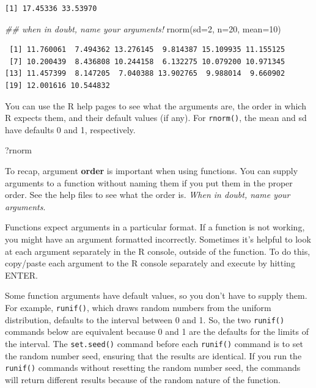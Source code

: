 \documentclass[
  13,
  letterpaper,
]{report}
\newenvironment{Shaded}{\begin{snugshade}}{\end{snugshade}}
\newcommand{\AttributeTok}[1]{\textcolor[rgb]{0.40,0.45,0.13}{#1}}
\newcommand{\DecValTok}[1]{\textcolor[rgb]{0.68,0.00,0.00}{#1}}
\newcommand{\DocumentationTok}[1]{\textcolor[rgb]{0.37,0.37,0.37}{\textit{#1}}}
\newcommand{\FunctionTok}[1]{\textcolor[rgb]{0.28,0.35,0.67}{#1}}
\newcommand{\NormalTok}[1]{\textcolor[rgb]{0.00,0.23,0.31}{#1}}
\begin{document}
\begin{verbatim}
[1] 17.45336 33.53970
\end{verbatim}

\begin{Shaded}
\begin{Highlighting}[]
\DocumentationTok{\#\# when in doubt, name your arguments!}
\FunctionTok{rnorm}\NormalTok{(}\AttributeTok{sd=}\DecValTok{2}\NormalTok{, }\AttributeTok{n=}\DecValTok{20}\NormalTok{, }\AttributeTok{mean=}\DecValTok{10}\NormalTok{)}
\end{Highlighting}
\end{Shaded}

\begin{verbatim}
 [1] 11.760061  7.494362 13.276145  9.814387 15.109935 11.155125
 [7] 10.200439  8.436808 10.244158  6.132275 10.079200 10.971345
[13] 11.457399  8.147205  7.040388 13.902765  9.988014  9.660902
[19] 12.001616 10.544832
\end{verbatim}

You can use the R help pages to see what the arguments are, the order in
which R expects them, and their default values (if any). For
\texttt{rnorm()}, the mean and sd have defaults 0 and 1, respectively.

\begin{Shaded}
\begin{Highlighting}[]
\NormalTok{?rnorm}
\end{Highlighting}
\end{Shaded}

To recap, argument \textbf{order} is important when using functions. You
can supply arguments to a function without naming them if you put them
in the proper order. See the help files to see what the order is.
\emph{When in doubt, name your arguments}.

Functions expect arguments in a particular format. If a function is not
working, you might have an argument formatted incorrectly. Sometimes
it's helpful to look at each argument separately in the R console,
outside of the function. To do this, copy/paste each argument to the R
console separately and execute by hitting ENTER.

Some function arguments have default values, so you don't have to supply
them. For example, \texttt{runif()}, which draws random numbers from the
uniform distribution, defaults to the interval between 0 and 1. So, the
two \texttt{runif()} commands below are equivalent because 0 and 1 are
the defaults for the limits of the interval. The \texttt{set.seed()}
command before each \texttt{runif()} command is to set the random number
seed, ensuring that the results are identical. If you run the
\texttt{runif()} commands without resetting the random number seed, the
commands will return different results because of the random nature of
the function.
\end{document}
